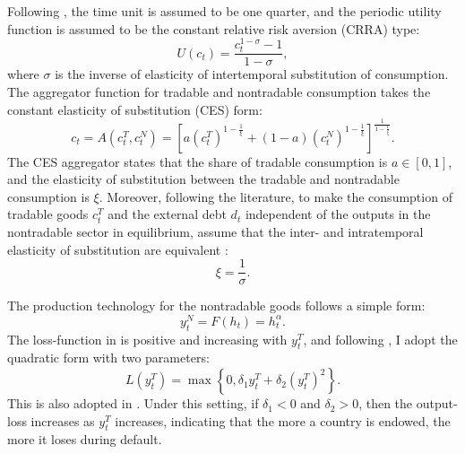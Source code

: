 Following \citet{Na-18}, the time unit is assumed to be one quarter, and the periodic utility function is assumed to be the constant relative risk aversion (CRRA) type:
\begin{equation}
    \label{eq:CRRA-utility}
    U(c_t) = \frac{c_t^{1-\sigma} - 1}{1 - \sigma},
\end{equation}
where $\sigma$ is the inverse of elasticity of intertemporal substitution of consumption.
The aggregator function for tradable and nontradable consumption takes the constant elasticity of substitution (CES) form:
\begin{equation}
    \label{eq:aggregator-function}
    c_t = A(c^T_t, c^N_t) =
        \left[ a \left( c^T_t \right)^{1- \frac{1}{\xi}} +
            (1 - a) \left( c^N_t \right)^{1- \frac{1}{\xi}}
        \right]^{\frac{1}{1 - \frac{1}{\xi}}}.
\end{equation}
The CES aggregator states that the share of tradable consumption is $a \in [0,1]$, and the elasticity of substitution between the tradable and nontradable consumption is $\xi$.
Moreover, following the literature, to make the consumption of tradable goods $c^T_t$ and the external debt $d_t$ independent of the outputs in the nontradable sector in equilibrium,
assume that the inter- and intratemporal elasticity of substitution are equivalent \citep*[see][Chapter 9.5]{Uribe-Schmitt-Grohe-textbook}:
\begin{equation}
    \label{eq:xi-sigma}
    \xi = \frac{1}{\sigma}.
\end{equation}

The production technology for the nontradable goods follows a simple form:
\begin{equation}
    \label{eq:production-function}
    y^N_t = F(h_t) = h_t ^\alpha.
\end{equation}
The loss-function in  is positive and increasing with $y^T_t$, and following \citet{Chatterjee-12}, I adopt the quadratic form with two parameters:
\begin{equation}
    L(y^T_t) = \max \left\{
        0, \delta_1 y^T_t + \delta_2 \left( y^T_t \right)^2
     \right\}.
\end{equation}
This is also adopted in \citet{Na-18}. Under this setting, if $\delta_1 < 0$ and $\delta_2 >0$, then the output-loss increases as $y^T_t$ increases, indicating that the more a country is endowed, the more it loses during default.